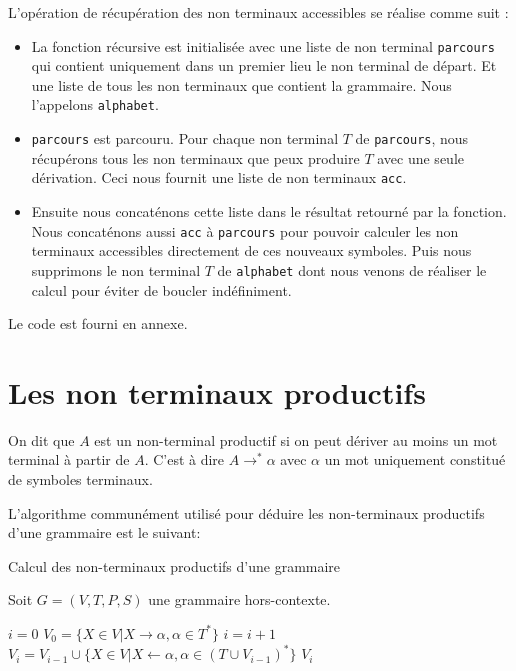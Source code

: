 \documentclass[11pt,a4paper]{article}
\def\code#1{\texttt{#1}} %
\begin{document}
L'opération de récupération des non terminaux accessibles se réalise
comme suit : 

\begin{itemize}
    \item La fonction récursive est initialisée avec une liste
    de non terminal \code{parcours} qui contient uniquement
    dans un premier lieu le non terminal de départ.
    Et une liste de tous les non terminaux que contient 
    la grammaire. Nous l'appelons \code{alphabet}.
    \item \code{parcours} est parcouru. Pour chaque non terminal $T$
    de \code{parcours}, nous récupérons tous les non terminaux
    que peux produire $T$ avec une seule dérivation. Ceci nous fournit
    une liste de non terminaux \code{acc}.
    \item Ensuite nous concaténons cette liste dans le résultat 
    retourné par la fonction. Nous concaténons aussi \code{acc}
    à \code{parcours} pour pouvoir calculer les non terminaux
    accessibles directement de ces nouveaux symboles. 
    Puis nous supprimons le non terminal $T$ de \code{alphabet} 
    dont nous venons de réaliser le calcul pour éviter de boucler indéfiniment.
\end{itemize}

Le code est fourni en annexe.

\newpage


\section{Les non terminaux productifs}

On dit que $A$ est un non-terminal productif si on peut dériver au moins un mot terminal à partir de $A$. C'est à dire $A \rightarrow^* \alpha$ avec $\alpha$ un mot uniquement constitué de symboles terminaux.
\newline

L'algorithme communément utilisé pour déduire les non-terminaux productifs d'une grammaire est le suivant:
\begin{algorithm}
\caption{Calcul des non-terminaux productifs d'une grammaire}
Soit $G=(V,T,P,S)$ une grammaire hors-contexte.
\begin{algorithmic}
\STATE $i = 0$
\STATE $V_0 = \{X \in V | X \rightarrow \alpha, \alpha \in T^*\}$
\REPEAT
\STATE $i=i+1$
\STATE $V_i = V_{i-1} \cup \{X \in V | X \leftarrow \alpha, \alpha \in (T \cup V_{i-1})^*\}$
\RETURN $V_i$
\end{algorithmic}
\end{algorithm}
\newline
\end{document}
